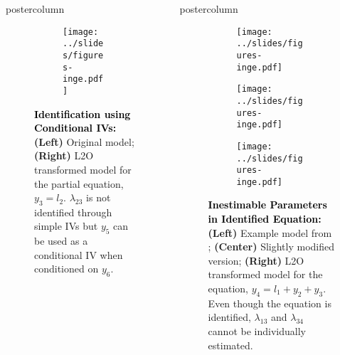 \documentclass{beamer}
\newlength{\columnheight}
\begin{document}
\begin{frame}
\begin{columns}
\begin{column}{.33\textwidth}
\begin{beamercolorbox}[center]{postercolumn}
\begin{minipage}{.98\textwidth}
{\begin{myblock}{}
\begin{figure}
\begin{subfigure}{0.5 \linewidth}
								\centering
								\texttt{[image: ../slides/figures-inge.pdf]}
							\end{subfigure}
							\caption*{\textbf{\textcolor{black}{Identification using Conditional IVs:}} \textbf{(Left)} Original model;
									\textbf{(Right)} L2O transformed model for the partial equation, $ y_3 = l_2 $. $ \lambda_{23} $ is not 
									identified through simple IVs but $y_5$ can be used as a conditional IV when conditioned on $ y_6 $.}						\end{figure}
					\end{myblock}\vfill
 				}
			\end{minipage}
		\end{beamercolorbox}
	\end{column}


	\begin{column}{0.33\textwidth}
		\begin{beamercolorbox}[center]{postercolumn}
			\begin{minipage}{.98\textwidth} %
				\parbox[t][\columnheight]{\textwidth}{ %
				\begin{myblock}{}
					\begin{figure}
						\begin{subfigure}{0.33 \linewidth}
							\centering
							\texttt{[image: ../slides/figures-inge.pdf]}
						\end{subfigure}%
						\begin{subfigure}{0.33 \linewidth}
							\centering
							\texttt{[image: ../slides/figures-inge.pdf]}
						\end{subfigure}%
						\begin{subfigure}{0.33 \linewidth}
							\centering
							\texttt{[image: ../slides/figures-inge.pdf]}
						\end{subfigure}
						\caption*{\textbf{\textcolor{black}{Inestimable Parameters in Identified Equation:}} \textbf{(Left)} Example model 
						from \citet{griliches1977estimating}; \textbf{(Center)} Slightly modified version; \textbf{(Right)} L2O transformed
						model for the equation, $ y_4 = l_1 + y_2 + y_3 $. Even though the equation is identified, $ \lambda_{13} $ and 
						$ \lambda_{34} $ cannot be individually estimated.}

\end{figure}
\end{myblock}}
\end{minipage}
\end{beamercolorbox}
\end{column}
\end{columns}
\end{frame}
\end{document}

